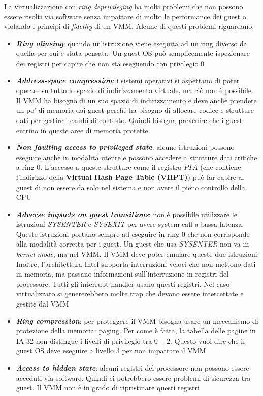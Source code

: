 \documentclass{article}
\begin{document}
La virtualizzazione con  \textit{ring deprivileging} ha molti problemi che non possono essere risolti via software senza impattare di molto le performance dei guest o violando i principi di \textit{fidelity} di un VMM. Alcune di questi problemi riguardano:
\begin{itemize}
  \item \textbf{\textit{Ring aliasing}}: quando un'istruzione viene eseguita ad un ring diverso da quella per cui è stata pensata. Un guest OS può semplicemente ispezionare dei registri per capire che non sta eseguendo con privilegio $0$
  \item \textbf{\textit{Address-space compression}}: i sistemi operativi si aspettano di poter operare su tutto lo spazio di indirizzamento virtuale, ma ciò non è possibile. Il VMM ha bisogno di un suo spazio di indirizzamento e deve anche prendere un po' di memoria dai guest perché ha bisogno di allocare codice e strutture dati per gestire i cambi di contesto. Quindi bisogna prevenire che i guest entrino in queste aree di memoria protette
  \item \textbf{\textit{Non faulting access to privileged state}}: alcune istruzioni possono eseguire anche in modalità utente e possono accedere a strutture dati critiche a ring $0$. L'accesso a queste strutture come il registro $PTA$ (che contiene l'indirizzo della \textbf{Virtual Hash Page Table (VHPT)}) può far capire al guest di non essere da solo nel sistema e non avere il pieno controllo della CPU
  \item \textbf{\textit{Adverse impacts on guest transitions}}: non è possibile utilizzare le istruzioni \textit{SYSENTER} e \textit{SYSEXIT} per avere system call a bassa latenza. Queste istruzioni portano sempre ad eseguire in ring $0$ che non corrisponde alla modalità corretta per i guest. Un guest che usa \textit{SYSENTER} non va in \textit{kernel mode}, ma nel VMM. Il VMM deve poter emulare queste due istruzioni. Inoltre, l'architettura Intel supporta interruzioni veloci che non mettono dati in memoria, ma passano informazioni sull'interruzione in registri del processore. Tutti gli interrupt handler usano questi registri. Nel caso virtualizzato si genererebbero molte trap che devono essere intercettate e gestite dal VMM
  \item \textbf{\textit{Ring compression}}: per proteggere il VMM bisogna usare un meccanismo di protezione della memoria: paging. Per come è fatta, la tabella delle pagine in IA-32 non distingue i livelli di privilegio tra $0-2$. Questo vuol dire che il guest OS deve eseguire a livello $3$ per non impattare il VMM
  \item \textbf{\textit{Access to hidden state}}: alcuni registri del processore non possono essere acceduti via software. Quindi ci potrebbero essere problemi di sicurezza tra guest. Il VMM non è in grado di ripristinare questi registri
\end{itemize}
\end{document}
